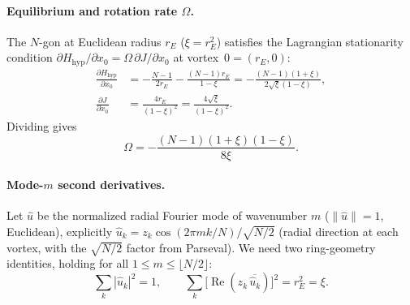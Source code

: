 \paragraph{Equilibrium and rotation rate $\Omega$.}
The $N$-gon at Euclidean radius $r_E$ ($\xi = r_E^2$) satisfies the
Lagrangian stationarity condition $\partial H_{\mathrm{hyp}}/\partial x_0
= \Omega\,\partial J/\partial x_0$ at vortex~$0 = (r_E, 0)$:
\begin{align*}
  \frac{\partial H_{\mathrm{hyp}}}{\partial x_0}
    &= -\frac{N-1}{2r_E} - \frac{(N-1)r_E}{1-\xi}
     = -\frac{(N-1)(1+\xi)}{2\sqrt{\xi}(1-\xi)}, \\
  \frac{\partial J}{\partial x_0}
    &= \frac{4r_E}{(1-\xi)^2}
     = \frac{4\sqrt{\xi}}{(1-\xi)^2}.
\end{align*}
Dividing gives
\begin{equation}\label{eq:Omega_H2}
  \Omega = -\frac{(N-1)(1+\xi)(1-\xi)}{8\xi}.
\end{equation}

\paragraph{Mode-$m$ second derivatives.}
Let $\hat u$ be the normalized radial Fourier mode of wavenumber $m$
($\|\hat u\|=1$, Euclidean), explicitly
$\hat u_k = z_k\cos(2\pi m k/N)/\sqrt{N/2}$ (radial direction at each
vortex, with the $\sqrt{N/2}$ factor from Parseval).
We need two ring-geometry identities, holding for all
$1 \le m \le \lfloor N/2\rfloor$:
\begin{equation}\label{eq:ring-identities}
  \sum_k |\hat u_k|^2 = 1, \qquad
  \sum_k \bigl[\operatorname{Re}(z_k\,\overline{\hat u_k})\bigr]^2
    = r_E^2 = \xi.
\end{equation}


